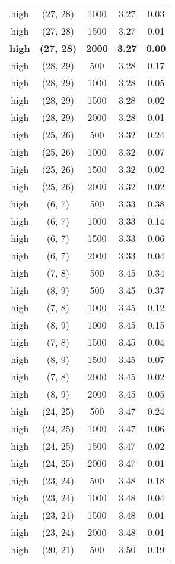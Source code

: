\begin{tabular}{c c c c c}
high & (27, 28) &  1000 & 3.27 & 0.03 \\
high & (27, 28) &  1500 & 3.27 & 0.01 \\
\textbf{high} & \textbf{(27, 28)} & \textbf{ 2000} & \textbf{3.27} & \textbf{0.00} \\
high & (28, 29) &  500 & 3.28 & 0.17 \\
high & (28, 29) &  1000 & 3.28 & 0.05 \\
high & (28, 29) &  1500 & 3.28 & 0.02 \\
high & (28, 29) &  2000 & 3.28 & 0.01 \\
high & (25, 26) &  500 & 3.32 & 0.24 \\
high & (25, 26) &  1000 & 3.32 & 0.07 \\
high & (25, 26) &  1500 & 3.32 & 0.02 \\
high & (25, 26) &  2000 & 3.32 & 0.02 \\
high & (6, 7) &  500 & 3.33 & 0.38 \\
high & (6, 7) &  1000 & 3.33 & 0.14 \\
high & (6, 7) &  1500 & 3.33 & 0.06 \\
high & (6, 7) &  2000 & 3.33 & 0.04 \\
high & (7, 8) &  500 & 3.45 & 0.34 \\
high & (8, 9) &  500 & 3.45 & 0.37 \\
high & (7, 8) &  1000 & 3.45 & 0.12 \\
high & (8, 9) &  1000 & 3.45 & 0.15 \\
high & (7, 8) &  1500 & 3.45 & 0.04 \\
high & (8, 9) &  1500 & 3.45 & 0.07 \\
high & (7, 8) &  2000 & 3.45 & 0.02 \\
high & (8, 9) &  2000 & 3.45 & 0.05 \\
high & (24, 25) &  500 & 3.47 & 0.24 \\
high & (24, 25) &  1000 & 3.47 & 0.06 \\
high & (24, 25) &  1500 & 3.47 & 0.02 \\
high & (24, 25) &  2000 & 3.47 & 0.01 \\
high & (23, 24) &  500 & 3.48 & 0.18 \\
high & (23, 24) &  1000 & 3.48 & 0.04 \\
high & (23, 24) &  1500 & 3.48 & 0.01 \\
high & (23, 24) &  2000 & 3.48 & 0.01 \\
high & (20, 21) &  500 & 3.50 & 0.19 \\

\end{tabular}
